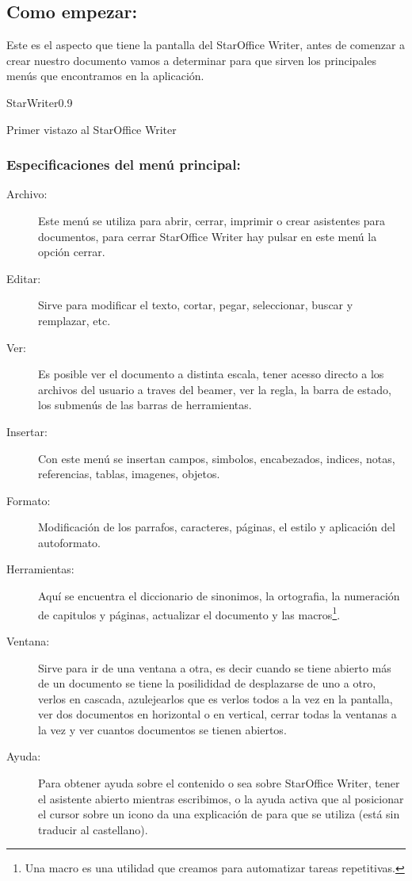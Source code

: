 \subsection{Como empezar:}

Este es el aspecto que tiene la pantalla del StarOffice Writer, antes de comenzar a crear
nuestro documento vamos a determinar para que sirven los principales menús que
encontramos en la aplicación.

\begin{figura}{StarWriter}{0.9}
\caption{Primer vistazo al StarOffice Writer}
\end{figura}



\subsubsection{Especificaciones del menú principal:}


\begin{description}
\item [\textmd{Archivo:}]Este menú se utiliza para abrir, cerrar, imprimir o crear
asistentes para documentos, para cerrar StarOffice Writer hay pulsar en este menú la
opción cerrar.
\item [\textmd{Editar:}]Sirve para modificar el texto, cortar, pegar, seleccionar,
buscar y remplazar, etc.
\item [\textmd{Ver:}]Es posible ver el documento a distinta escala, tener acesso directo
a los archivos del usuario a traves del beamer, ver la regla, la barra de estado,
los submenús de las barras de herramientas.
\item [\textmd{Insertar:}]Con este menú se insertan campos, simbolos, encabezados,
indices, notas, referencias, tablas, imagenes, objetos.
\item [\textmd{Formato:}]Modificación de los parrafos, caracteres, páginas, el estilo
y aplicación del autoformato.
\item [\textmd{Herramientas:}]Aquí se encuentra el diccionario de sinonimos, la ortografia,
la numeración de capitulos y páginas, actualizar el documento y las macros\footnote{%
Una macro es una utilidad que creamos para automatizar tareas repetitivas.
}.
\item [\textmd{Ventana:}]Sirve para ir de una ventana a otra, es decir cuando se tiene
abierto más de un documento se tiene la posilididad de desplazarse de uno a
otro, verlos en cascada, azulejearlos que es verlos todos a la vez en la pantalla,
ver dos documentos en horizontal o en vertical, cerrar todas la ventanas a la
vez y ver cuantos documentos se tienen abiertos.
\item [\textmd{Ayuda:}]Para obtener ayuda sobre el contenido o sea sobre StarOffice Writer,
tener el asistente abierto mientras escribimos, o la ayuda activa que al posicionar
el cursor sobre un icono da una explicación de para que se utiliza (está sin
traducir al castellano).
\end{description}

